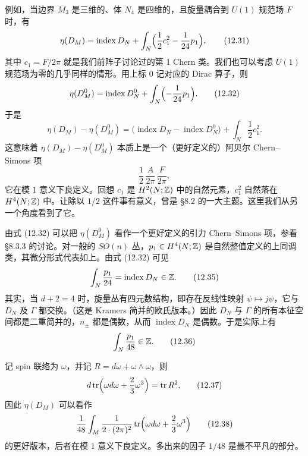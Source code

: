 例如，当边界 $M_3$ 是三维的、体 $N_4$ 是四维的，且旋量耦合到 $U(1)$ 规范场 $F$ 时，有
\begin{equation}
  \eta(D_M)=\operatorname{index}D_N
  +\int_N\Bigl(\frac{1}{2}c_1^2-\frac{1}{24}p_1\Bigr),
  \tag{12.31}
\end{equation}
其中 $c_1=F/2\pi$ 就是我们前阵子讨论过的第 1 Chern 类。我们也可以考虑 $U(1)$ 规范场为零的几乎同样的情形。用上标 $0$ 记对应的 Dirac 算子，则
\begin{equation}
  \eta(D_M^0)=\operatorname{index}D_N^0+\int_N\Bigl(-\frac{1}{24}p_1\Bigr).
  \tag{12.32}
\end{equation}
于是
\begin{equation}
  \eta(D_M)-\eta(D_M^0)
  =\bigl(\operatorname{index}D_N-\operatorname{index}D_N^0\bigr)
  +\int_N\frac{1}{2}c_1^2 .
  \tag{12.33}
\end{equation}
这意味着 $\eta(D_M)-\eta(D_M^0)$ 本质上是一个（更好定义的）阿贝尔 Chern--Simons 项
\begin{equation}
  \frac{1}{2}\,\frac{A}{2\pi}\,\frac{F}{2\pi},
  \tag{12.34}
\end{equation}
它在模 $1$ 意义下良定义。回想 $c_1$ 是 $H^2(N;\mathbb{Z})$ 中的自然元素，$c_1^2$ 自然落在 $H^4(N;\mathbb{Z})$ 中。让除以 $1/2$ 这件事有意义，曾是 §8.2 的一大主题。这里我们从另一个角度看到了它。

由式 (12.32) 可以把 $\eta(D_M^0)$ 看作一个更好定义的引力 Chern--Simons 项，参看 §8.3.3 的讨论。对一般的 $SO(n)$ 丛，$p_1\in H^4(N;\mathbb{Z})$ 是自然整值定义的上同调类，其微分形式代表如上。由式 (12.32) 可见
\begin{equation}
  \int_N\frac{p_1}{24}=\operatorname{index}D_N\in\mathbb{Z} .
  \tag{12.35}
\end{equation}
其实，当 $d+2=4$ 时，旋量丛有四元数结构，即存在反线性映射 $\psi\mapsto j\psi$，它与 $D_N$ 及 $\Gamma$ 都交换。（这是 Kramers 简并的欧氏版本。）因此 $D_N$ 与 $\Gamma$ 的所有本征空间都是二重简并的，$n_\pm$ 都是偶数，从而 $\operatorname{index}D_N$ 是偶数。于是实际上有
\begin{equation}
  \int_N\frac{p_1}{48}\in\mathbb{Z} .
  \tag{12.36}
\end{equation}

记 spin 联络为 $\omega$，并记 $R=d\omega+\omega\wedge\omega$，则
\begin{equation}
  d\operatorname{tr}\Bigl(\omega d\omega+\frac{2}{3}\omega^3\Bigr)=\operatorname{tr} R^2 .
  \tag{12.37}
\end{equation}
因此 $\eta(D_M)$ 可以看作
\begin{equation}
  \frac{1}{48}\int_M\frac{1}{2\cdot(2\pi)^2}
  \operatorname{tr}\Bigl(\omega d\omega+\frac{2}{3}\omega^3\Bigr)
  \tag{12.38}
\end{equation}
的更好版本，后者在模 $1$ 意义下良定义。多出来的因子 $1/48$ 是最不平凡的部分。

